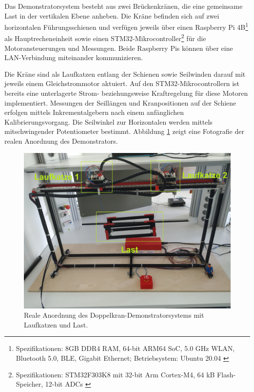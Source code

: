 Das Demonstratorsystem besteht aus zwei Brückenkränen, die eine gemeinsame Last in der vertikalen Ebene anheben. Die Kräne befinden sich auf zwei horizontalen Führungsschienen und verfügen jeweils über einen Raspberry Pi 4B\footnote{Spezifikationen: 8GB DDR4 RAM, 64-bit ARM64 SoC, 5.0 GHz WLAN, Bluetooth 5.0, BLE, Gigabit Ethernet; Betriebsystem: Ubuntu 20.04 \cite{RpiSpecs}} als Hauptrecheneinheit sowie einen STM32-Mikrocontroller\footnote{Spezifikationen: STM32F303K8 mit 32-bit Arm Cortex-M4, 64 kB Flash-Speicher, 12-bit ADCs \cite{STM32Specs}} für die Motoransteuerungen und Messungen. Beide Raspberry Pis können über eine LAN-Verbindung miteinander kommunizieren.

Die Kräne sind als Laufkatzen entlang der Schienen sowie Seilwinden darauf mit jeweils einem Gleichstrommotor aktuiert. Auf den STM32-Mikrocontrollern ist bereits eine unterlagerte Strom- beziehungsweise Kraftregelung für diese Motoren implementiert.
Messungen der Seillängen und Kranpositionen auf der Schiene erfolgen mittels Inkrementalgebern nach einem anfänglichen Kalibrierungsvorgang. Die Seilwinkel zur Horizontalen werden mittels mitschwingender Potentiometer bestimmt. Abbildung \ref{fig:demonstrator_real} zeigt eine Fotografie der realen Anordnung des Demonstrators.

\begin{figure}[ht]
	\begin{center}
		\includegraphics[scale=0.11]{Pictures/real_gantry.jpg}
	\end{center}
	\caption[Doppelkran-Demonstratorsystem mit Laufkatzen und Last]
	{Reale Anordnung des Doppelkran-Demonstratorsystems mit Laufkatzen und Last.}
	\label{fig:demonstrator_real}
\end{figure}

